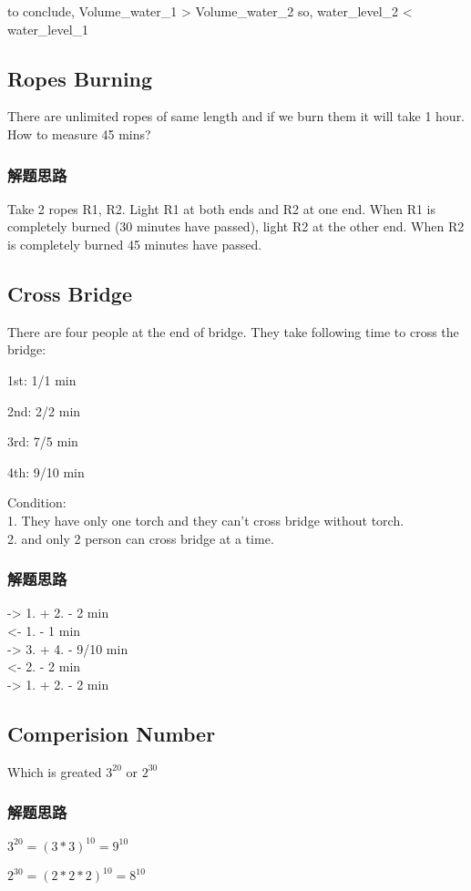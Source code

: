 to conclude, Volume_water_1 > Volume_water_2 
so, water_level_2 < water_level_1

\subsection{Ropes Burning}
There are unlimited ropes of same length and if we burn them it will take 1 hour. 
How to measure 45 mins?

\subsubsection{解题思路}
Take 2 ropes R1, R2. Light R1 at both ends and R2 at one end. When R1 is completely burned (30 minutes have passed), light R2 at the other end. When R2 is completely burned 45 
minutes have passed.

\subsection{Cross Bridge}
There are four people at the end of bridge. They take following time to cross the bridge: 

1st: 1/1 min 

2nd: 2/2 min 

3rd: 7/5 min 

4th: 9/10 min 

Condition: \\
1. They have only one torch and they can't cross bridge without torch. \\
2. and only 2 person can cross bridge at a time.

\subsubsection{解题思路}
-> 1. + 2. - 2 min\\
<- 1.      - 1 min\\
-> 3. + 4. - 9/10 min\\
<- 2.      - 2 min\\
-> 1. + 2. - 2 min

\subsection{Comperision Number}
Which is greated $3^{20}$ or $2^{30}$
\subsubsection{解题思路}
$3^{20}=(3*3)^{10}=9^{10}$

$2^{30}=(2*2*2)^{10}=8^{10}$